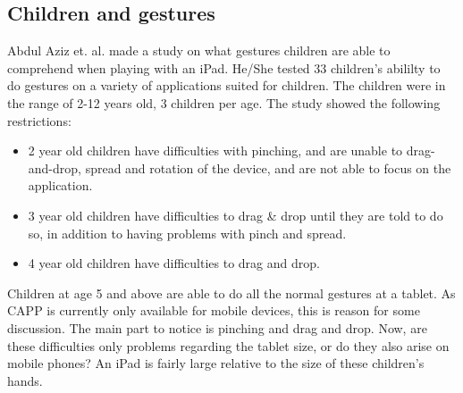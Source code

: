 \subsection{Children and gestures}

Abdul Aziz et. al. \cite{aziz2013children} made a study on what gestures children are able to comprehend when playing with an iPad. He/She tested 33 children's abililty to do gestures on a variety of applications suited for children. The children were in the range of 2-12 years old, 3 children per age. The study showed the following restrictions:

\begin{itemize}
  \item 2 year old children have difficulties with pinching, and are unable to drag-and-drop, spread and rotation of the device, and are not able to focus on the application. 
  \item 3 year old children have difficulties to drag \& drop until they are told to do so, in addition to having problems with pinch and spread. 
  \item 4 year old children have difficulties to drag and drop. 
\end{itemize}
Children at age 5 and above are able to do all the normal gestures at a tablet. As CAPP is currently only available for mobile devices, this is reason for some discussion. The main part to notice is pinching and drag and drop. Now, are these difficulties only problems regarding the tablet size, or do they also arise on mobile phones? An iPad is fairly large relative to the size of these children's hands. 


